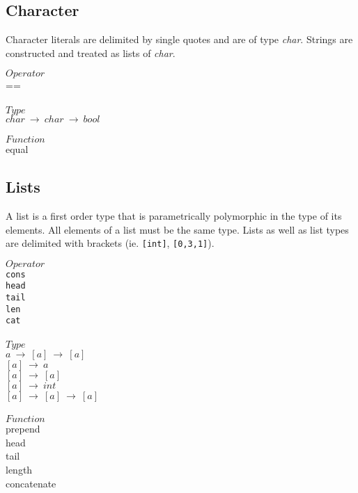 ﻿\documentclass[5pt]{article}
\begin{document}
\subsection{Character}
Character literals are delimited by single quotes and are of type \textit{char}. 
Strings are constructed and treated as lists of \textit{char}.
\begin{multicols}{3}
\noindent $Operator$ \\
\hspace*{5mm} == \\
\columnbreak \\
\noindent $Type$ \\
$char \ \rightarrow \ char \ \rightarrow \ bool $ \\
\columnbreak \\
\noindent $Function$ \\
equal \\
\end{multicols}
\subsection{Lists}
A list is a first order type that is parametrically polymorphic in the type of 
its elements. All elements of a list must be the same type. Lists as well as 
list types are delimited with brackets (ie. \texttt{[int]}, \texttt{[0,3,1]}).
\begin{multicols}{3}
\noindent $Operator$ \\
\hspace*{5mm} \texttt{cons} \\
\hspace*{5mm} \texttt{head} \\
\hspace*{5mm} \texttt{tail} \\
\hspace*{5mm} \texttt{len} \\
\hspace*{5mm} \texttt{cat} \\
\columnbreak \\
\noindent $Type$ \\
$a \ \rightarrow \ [a] \ \rightarrow \ [a] $ \\
$[a] \ \rightarrow \ a $ \\
$[a] \ \rightarrow \ [a] $ \\
$[a] \ \rightarrow \ int $ \\
$[a] \ \rightarrow \ [a] \ \rightarrow \ [a] $ \\
\columnbreak \\
\noindent $Function$ \\
prepend \\
head \\
tail \\
length \\
concatenate \\
\end{multicols}
\end{document}
